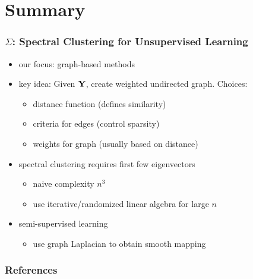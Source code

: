 \documentclass[12pt,handout]{beamer}
\begin{document}
\section{Summary} %
\label{sec:summary}
\begin{frame}
	\frametitle{$\Sigma$: Spectral Clustering for Unsupervised Learning}
	
\begin{itemize}
	\item our focus: graph-based methods
	\item key idea: Given ${\bf Y}$, create weighted undirected graph. Choices:
		\begin{itemize}
			\item distance function (defines similarity)
			\item criteria for edges (control sparsity)
			\item weights for graph (usually based on distance)
		\end{itemize}
	\item spectral clustering requires first few eigenvectors
	\begin{itemize}
		\item naive complexity $n^3$
		\item use iterative/randomized linear algebra for large $n$
	\end{itemize}
	\item semi-supervised learning
	\begin{itemize}
		\item use graph Laplacian to obtain smooth mapping
	\end{itemize}
	\end{itemize}
\end{frame}


\begin{frame}[allowframebreaks]
	\frametitle{References}
 


\end{frame}
\end{document}
